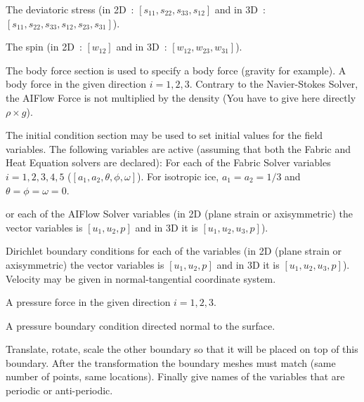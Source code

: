 %
 \sifbegin
%
The deviatoric stress (in 2D~: $[s_{11}, s_{22}, s_{33}, s_{12}]$ and in 3D~: $[s_{11}, s_{22}, s_{33}, s_{12}, s_{23},
s_{31}]$).
 \sifend

%
 \sifbegin
%
 The spin (in 2D~: $[w_{12}]$ and in 3D~: $[w_{12}, w_{23}, w_{31}]$).

\sifend




The body force section is used to specify a body force (gravity for example).
 \sifbegin
%
A body force in the given direction $i=1,2,3$. Contrary to the Navier-Stokes Solver, the AIFlow Force is not multiplied
by the density (You have to give here directly $\rho \times g$).
 \sifend




The initial condition section may be used to set initial values for the field variables. The following variables are
active (assuming that both the Fabric and Heat Equation solvers are declared):
 \sifbegin
%
 For each of the Fabric Solver variables $i=1,2,3,4,5$ ($[a_1 , a_2 , \theta, \phi, \omega]$). For isotropic ice,
 $a_1=a_2=1/3$ and $\theta=\phi=\omega=0$.

%
or each of the AIFlow Solver variables (in 2D (plane strain or axisymmetric) the vector variables is $[u_1, u_2, p]$
and in 3D it is $[u_1, u_2, u_3, p]$).
%
 \sifend

\sifbegin

%
Dirichlet boundary conditions for each of the variables (in 2D (plane strain or axisymmetric) the vector variables is
$[u_1, u_2, p]$ and in 3D it is $[u_1, u_2, u_3, p]$).
%
%
Velocity may be given in normal-tangential coordinate system.

%
A pressure force in the given direction $i=1,2,3$.

%
A pressure boundary condition directed normal to the surface.
\sifend

\sifbegin
%

%
%
%
%
Translate, rotate, scale the other boundary so that it will be placed on top of this boundary. After the transformation
the boundary meshes must match (same number of points, same locations). Finally give names of the variables that are
periodic or anti-periodic.



  \sifend

 \sifend
